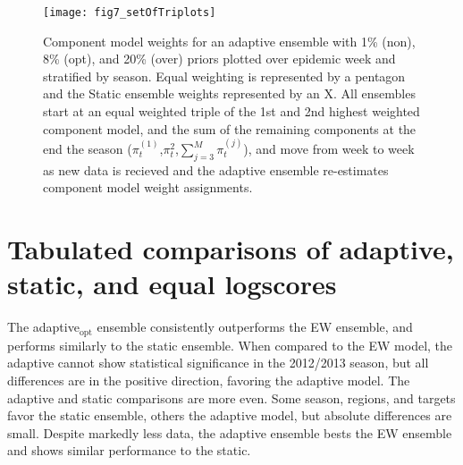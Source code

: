 \documentclass[12pt]{article}
\begin{document}
\graphicspath{{../_6_TLGs/_G/fig7_setOfTriPlots/}}
\begin{figure}[ht!]
    \centering
    \texttt{[image: fig7\_setOfTriplots]}
    \caption{Component model weights for an adaptive ensemble with 1\% (non), 8\% (opt), and 20\% (over) priors plotted over epidemic week and stratified by season.
    Equal weighting is represented by a pentagon and the Static ensemble weights represented by an X.
    All ensembles start at an equal weighted triple of the 1st and 2nd highest weighted component model, and the sum of the remaining components at the end the season ($\pi_{t}^{(1)}$,$\pi_{t}^{2}$,$\sum_{j=3}^{M}\pi_{t}^{(j)}$), and move from week to week as new data is recieved and the adaptive ensemble re-estimates component model weight assignments.
        \label{fig.bagOfDoritos}}
\end{figure}


\section{Tabulated comparisons of adaptive, static, and equal logscores}
\label{tbRegress}

The adaptive$_{\text{opt}}$ ensemble consistently outperforms the EW ensemble, and performs similarly to the static ensemble.
When compared to the EW model, the adaptive cannot show statistical significance in the 2012/2013 season, but all differences are in the positive direction, favoring the adaptive model.
The adaptive and static comparisons are more even.
Some season, regions, and targets favor the static ensemble, others the adaptive model, but absolute differences are small.
Despite markedly less data, the adaptive ensemble bests the EW ensemble and shows similar performance to the static.
\end{document}
